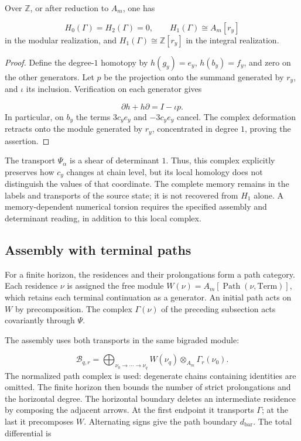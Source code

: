 \begin{proposition}
\label{act21:prop:continuo-homologia-memoria}
Over \(\mathbb Z\), or after reduction to \(A_m\), one has

\[
H_0(\Gamma)=H_2(\Gamma)=0,
\qquad H_1(\Gamma)\cong A_m[r_y]
\]
in the modular realization, and \(H_1(\Gamma)\cong\mathbb Z[r_y]\) in the integral realization.
\end{proposition}
\begin{proof}
Define the degree-\(1\) homotopy by \(h(g_y)=e_y\), \(h(b_y)=f_y\), and zero on the other generators. Let \(p\) be the projection onto the summand generated by \(r_y\), and \(\iota\) its inclusion. Verification on each generator gives

\[
\partial h+h\partial=I-\iota p.
\]
In particular, on \(b_y\) the terms \(3c_ye_y\) and \(-3c_ye_y\) cancel. The complex deformation retracts onto the module generated by \(r_y\), concentrated in degree \(1\), proving the assertion.
\end{proof}

The transport \(\Psi_\alpha\) is a shear of determinant \(1\). Thus, this complex explicitly preserves how \(c_y\) changes at chain level, but its local homology does not distinguish the values of that coordinate. The complete memory remains in the labels and transports of the source state; it is not recovered from \(H_1\) alone. A memory-dependent numerical torsion requires the specified assembly and determinant reading, in addition to this local complex.

\subsection{Assembly with terminal paths}
For a finite horizon, the residences and their prolongations form a path category. Each residence \(\nu\) is assigned the free module \(W(\nu)=A_m[\operatorname{Path}(\nu,\mathrm{Term})]\), which retains each terminal continuation as a generator. An initial path acts on \(W\) by precomposition. The complex \(\Gamma(\nu)\) of the preceding subsection acts covariantly through \(\Psi\).

The assembly uses both transports in the same bigraded module:

\[
\mathcal B_{q,r}=
\bigoplus_{\nu_0\to\cdots\to\nu_q}
W(\nu_q)\otimes_{A_m}\Gamma_r(\nu_0).
\]
The normalized path complex is used: degenerate chains containing identities are omitted. The finite horizon then bounds the number of strict prolongations and the horizontal degree. The horizontal boundary deletes an intermediate residence by composing the adjacent arrows. At the first endpoint it transports \(\Gamma\); at the last it precomposes \(W\). Alternating signs give the path boundary \(d_{\mathrm{bar}}\). The total differential is

